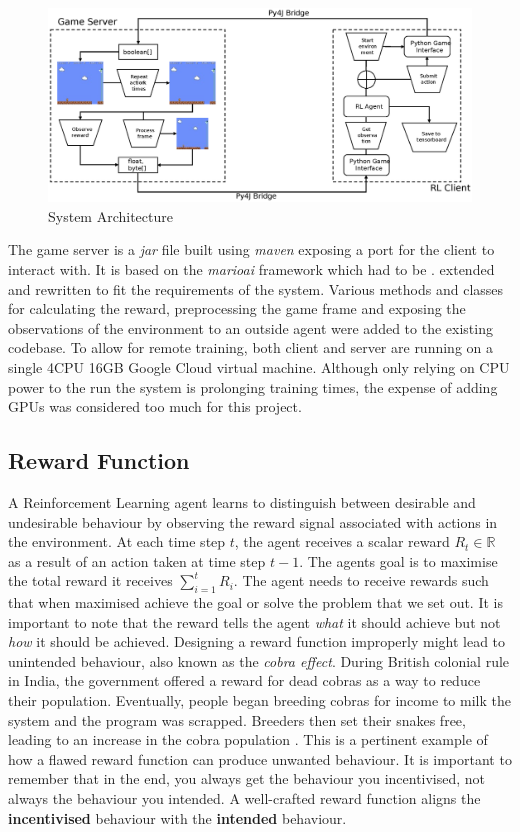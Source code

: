 \documentclass[notitlepage,a4paper,11pt]{article}
\newcommand{\R}{\mathbb{R}}
\begin{document}
\begin{figure}[!htb]\label{fig:system_architecture}
\centering
\includegraphics[trim={0 2cm 0 2cm},clip,width=1\linewidth]{figs/system_architecture.eps}
\caption{System Architecture}
\end{figure}

The game server is a \textit{jar} file built using \textit{maven} exposing a port for the client to interact with. It is based on the \textit{marioai} \cite{marioai} framework which had to be . extended and rewritten to fit the requirements of the system. Various methods and classes for calculating the reward, preprocessing the game frame and exposing the observations of the environment to an outside agent were added to the existing codebase. To allow for remote training, both client and server are running on a single 4CPU 16GB Google Cloud virtual machine. Although only relying on CPU power to the run the system is prolonging training times, the expense of adding GPUs was considered too much for this project.


\subsection{Reward Function} \label{reward_function}

A Reinforcement Learning agent learns to distinguish between desirable and undesirable behaviour by observing the reward signal associated with actions in the environment. At each time step $t$, the agent receives a scalar reward $R_t \in \R$ as a result of an action taken at time step $t-1$. The agents goal is to maximise the total reward it receives $\sum^{t}_{i=1} R_i$. The agent needs to receive rewards such that when maximised achieve the goal or solve the problem that we set out. It is important to note that the reward tells the agent \textit{what} it should achieve but not \textit{how} it should be achieved. Designing a reward function improperly might lead to unintended behaviour, also known as the \textit{cobra effect}. During British colonial rule in India, the government offered a reward for dead cobras as a way to reduce their population. Eventually, people began breeding cobras for income to milk the system and the program was scrapped. Breeders then set their snakes free, leading to an increase in the cobra population \cite{siebert2001kobra}. This is a pertinent example of how a flawed reward function can produce unwanted behaviour. It is important to remember that in the end, you always get the behaviour you incentivised, not always the behaviour you intended. A well-crafted reward function aligns the \textbf{incentivised} behaviour with the \textbf{intended} behaviour.
\end{document}
